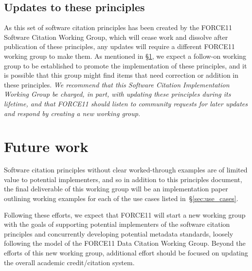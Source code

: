 \documentclass[12pt, oneside]{amsart}
\newcommand{\katznote}[1]{ {\textcolor{blue} { ***DSK: #1 }}} %
\newcommand{\LJHnote}[1]{ {\textcolor{fuschsia} { ***LJH: #1 }}} %
\begin{document}

%

\subsection{Updates to these principles}

As this set of software citation principles has been created by the FORCE11 Software Citation Working Group, which will cease work and dissolve after publication of these principles,
any updates will require a different FORCE11 working group to make them.
As mentioned in \S\ref{sec:futurework}, we expect a follow-on working group to be established to promote the implementation of
these principles, and it is possible that this group might find items that need correction or addition
in these principles.
\textit{We recommend that this Software Citation Implementation Working Group be charged, in part,
with updating these principles during its lifetime, and that FORCE11 should listen to community requests for later updates and respond by creating a new working group.}


\section{Future work}
\label{sec:futurework}

Software citation principles without clear worked-through examples are of
limited value to potential implementers, and so in addition to this principles
document, the final deliverable of this working group will be an implementation
paper outlining working examples for each of the use cases listed in~\S\ref{sec:use_cases}.

Following these efforts, we expect that FORCE11 will start a new working group
with the goals of supporting potential implementers of the software citation
principles and concurrently developing potential metadata standards, loosely following the model
of the FORCE11 Data Citation Working Group.
Beyond the efforts of this new working group, additional effort should be focused on updating the overall academic credit\slash citation system.

\end{document}
